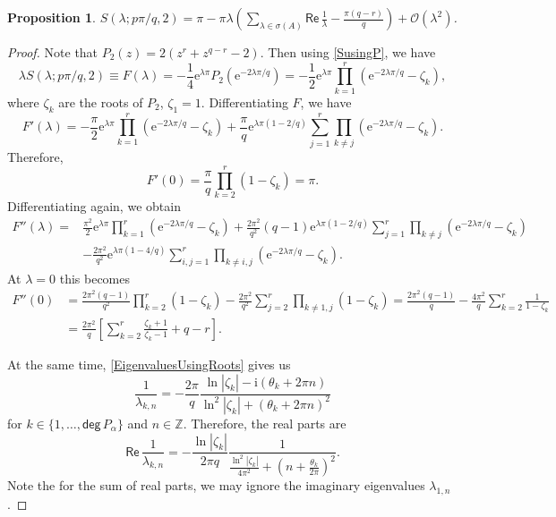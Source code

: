 \documentclass[11pt, a4paper,reqno]{amsart}
\theoremstyle{plain}
\newtheorem{proposition}[theorem]{Proposition}
\theoremstyle{definition}
\theoremstyle{remark}
\newcommand{\1}{\mathds 1}
\renewcommand{\Re}{\mathsf{Re}\,}
\renewcommand{\deg}{\mathsf{deg}\,}
\begin{document}
\begin{proposition}\label{TaylorWithP}
    $S(\lambda; p\pi/q, 2) = \pi - \pi\lambda\left(\sum_{\lambda\in\sigma(A)}\Re \frac{1}{\lambda} - \frac{\pi(q-r)}{q}\right) + \mathcal O(\lambda^2)$.
\end{proposition}
\begin{proof}
    Note that $P_2(z) = 2(z^r + z^{q-r}-2)$. Then using \eqref{SusingP}, we have
    \[
    \lambda S(\lambda; p\pi/q, 2) \equiv F(\lambda) = -\frac{1}{4}\mathrm{e}^{\lambda\pi}P_{2}\left(\mathrm{e}^{-2\lambda\pi/q}\right) = -\frac{1}{2}\mathrm{e}^{\lambda\pi}\prod_{k=1}^r \left(\mathrm{e}^{-2\lambda\pi/q}-\zeta_k\right),
    \]
    where $\zeta_k$ are the roots of $P_2$, $\zeta_1 = 1$. Differentiating $F$, we have
    \[
    F'(\lambda) = - \frac{\pi}{2}\mathrm{e}^{\lambda\pi}\prod_{k=1}^r\left(\mathrm{e}^{-2\lambda\pi/q} - \zeta_k\right) + \frac{\pi}{q}\mathrm{e}^{\lambda\pi(1-2/q)}\sum_{j=1}^r\prod_{k\neq j}\left(\mathrm{e}^{-2\lambda\pi/q} - \zeta_k\right).
    \]
    Therefore,
    \[
    F'(0) = \frac{\pi}{q}\prod_{k=2}^r\left(1-\zeta_k\right) = \pi.
    \]
    Differentiating again, we obtain
    \begin{align*}
        F''(\lambda) = &\frac{\pi^2}{2}\mathrm{e}^{\lambda\pi}\prod_{k=1}^r\left(\mathrm{e}^{-2\lambda\pi/q}-\zeta_k\right) + \frac{2\pi^2}{q^2}(q-1)\mathrm{e}^{\lambda\pi(1-2/q)}\sum_{j=1}^r\prod_{k\neq j}\left(\mathrm{e}^{-2\lambda\pi/q}-\zeta_k\right) \\
        &- \frac{2\pi^2}{q^2}\mathrm{e}^{\lambda\pi(1-4/q)}\sum_{i,j =1}^r\prod_{k\neq i,j}\left(\mathrm{e}^{-2\lambda\pi/q}-\zeta_k\right).
    \end{align*}
    At $\lambda = 0$ this becomes
    \begin{align}
    F''(0) &= \frac{2\pi^2(q-1)}{q^2}\prod_{k=2}^r\left(1-\zeta_k\right) - \frac{2\pi^2}{q^2}\sum_{j=2}^r\prod_{k\neq 1, j}(1-\zeta_k) = \frac{2\pi^2(q-1)}{q}-\frac{4\pi^2}{q}\sum_{k=2}^r\frac{1}{1-\zeta_k} \nonumber\\
    & = \frac{2\pi^2}{q}\left[\sum_{k=2}^r \frac{\zeta_k+1}{\zeta_k - 1} + q-r\right].
    \label{Computation}
    \end{align}

    At the same time, \eqref{EigenvaluesUsingRoots} gives us
    \[
    \frac{1}{\lambda_{k,n}} = -\frac{2\pi}{q}\frac{\ln|\zeta_k| -\mathrm{i}(\theta_k + 2\pi n)}{\ln^2|\zeta_k| + (\theta_k + 2\pi n)^2}
    \]
    for $k \in \{1, \dots, \deg P_\alpha\}$ and $n \in \mathbb Z$. Therefore, the real parts are
    \[
    \Re \frac{1}{\lambda_{k,n}} = -\frac{\ln |\zeta_k|}{2\pi q}\frac{1}{\frac{\ln^2|\zeta_k|}{4\pi^2} + \left(n+\frac{\theta_k}{2\pi}\right)^2}.
    \]
    Note the for the sum of real parts, we may ignore the imaginary eigenvalues $\lambda_{1,n}$.


\end{proof}
\end{document}

